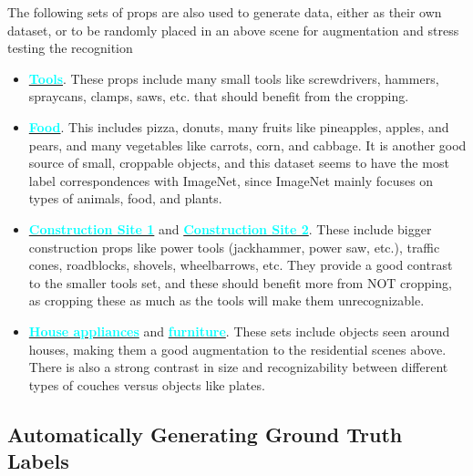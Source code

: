 The following sets of props are also used to generate data, either as their own dataset, or to be randomly placed in an above scene for augmentation and stress testing the recognition
\begin{itemize}
    \item \textbf{\href{https://www.unrealengine.com/marketplace/en-US/product/toolshed-garage-props-vol-1-hand-tools-clamps-etc}{\textcolor{cyan}{Tools}}}. These props include many small tools like screwdrivers, hammers, spraycans, clamps, saws, etc. that should benefit from the cropping.
    \item \textbf{\href{https://www.unrealengine.com/marketplace/en-US/product/food-pack}{\textcolor{cyan}{Food}}}. This includes pizza, donuts, many fruits like pineapples, apples, and pears, and many vegetables like carrots, corn, and cabbage. It is another good source of small, croppable objects, and this dataset seems to have the most label correspondences with ImageNet, since ImageNet mainly focuses on types of animals, food, and plants.
    \item \textbf{\href{https://www.unrealengine.com/marketplace/en-US/product/construction-site-vol-1-supply-and-material-props}{\textcolor{cyan}{Construction Site 1}}} and \textbf{\href{https://www.unrealengine.com/marketplace/en-US/product/construction-site-vol-2-tools-parts-and-machine-props}{\textcolor{cyan}{Construction Site 2}}}. These include bigger construction props like power tools (jackhammer, power saw, etc.), traffic cones, roadblocks, shovels, wheelbarrows, etc. They provide a good contrast to the smaller tools set, and these should benefit more from NOT cropping, as cropping these as much as the tools will make them unrecognizable.
    \item \textbf{\href{https://www.unrealengine.com/marketplace/en-US/product/hq-residential-house}{\textcolor{cyan}{House appliances}}} and \textbf{\href{https://www.unrealengine.com/marketplace/en-US/product/a4907129f69c44a892f76782489736ab}{\textcolor{cyan}{furniture}}}. These sets include objects seen around houses, making them a good augmentation to the residential scenes above. There is also a strong contrast in size and recognizability between different types of couches versus objects like plates.
\end{itemize}

\subsection{Automatically Generating Ground Truth Labels}

